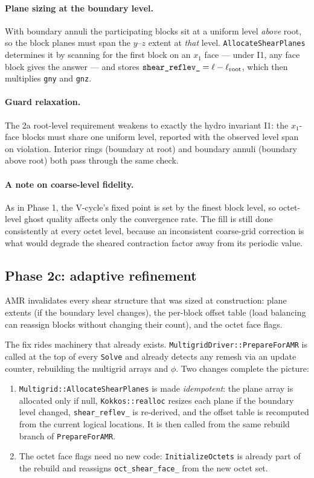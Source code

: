 \documentclass[11pt]{article}
\newcommand{\code}[1]{\texttt{#1}}
\newcommand{\fn}[1]{\texttt{\small #1}}
\begin{document}
\paragraph{Plane sizing at the boundary level.} With boundary annuli the participating
blocks sit at a uniform level \emph{above} root, so the block planes must span the
$y$--$z$ extent at \emph{that} level. \fn{AllocateShearPlanes} determines it by
scanning for the first block on an $x_1$ face --- under I1, any face block gives the
answer --- and stores $\code{shear\_reflev\_} = \ell - \ell_{\rm root}$, which then
multiplies \code{gny} and \code{gnz}.

\paragraph{Guard relaxation.} The 2a root-level requirement weakens to exactly the
hydro invariant I1: the $x_1$-face blocks must share one uniform level, reported with
the observed level span on violation. Interior rings (boundary at root) and boundary
annuli (boundary above root) both pass through the same check.

\paragraph{A note on coarse-level fidelity.} As in Phase 1, the V-cycle's fixed point
is set by the finest block level, so octet-level ghost quality affects only the
convergence rate. The fill is still done consistently at every octet level, because an
inconsistent coarse-grid correction is what would degrade the sheared contraction
factor away from its periodic value.

\subsection{Phase 2c: adaptive refinement}
\label{sec:phase2c}

AMR invalidates every shear structure that was sized at construction: plane extents
(if the boundary level changes), the per-block offset table (load balancing can
reassign blocks without changing their count), and the octet face flags.

The fix rides machinery that already exists. \fn{MultigridDriver::PrepareForAMR} is
called at the top of every \fn{Solve} and already detects any remesh via an update
counter, rebuilding the multigrid arrays and $\phi$. Two changes complete the picture:

\begin{enumerate}\itemsep3pt
\item \fn{Multigrid::AllocateShearPlanes} is made \emph{idempotent}: the plane array
      is allocated only if null, \code{Kokkos::realloc} resizes each plane if the
      boundary level changed, \code{shear\_reflev\_} is re-derived, and the offset
      table is recomputed from the current logical locations. It is then called from
      the same rebuild branch of \fn{PrepareForAMR}.
\item The octet face flags need no new code: \fn{InitializeOctets} is already part of
      the rebuild and reassigns \code{oct\_shear\_face\_} from the new octet set.
\end{enumerate}
\end{document}
